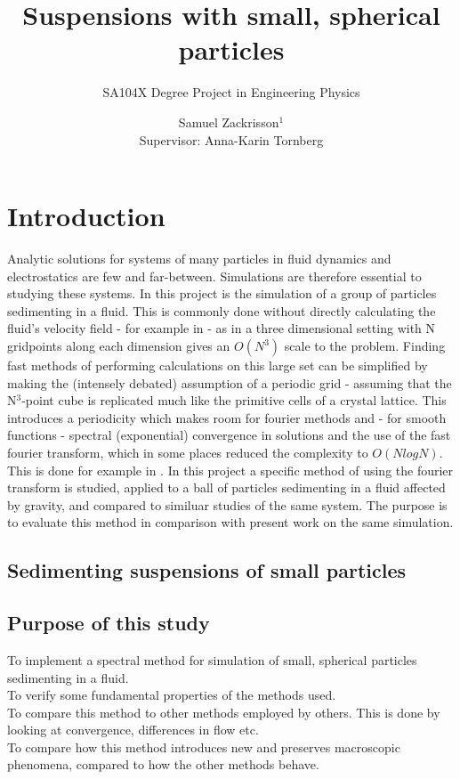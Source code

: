 \documentclass[a4paper,twoside=false,abstract=false,numbers=noenddot,
titlepage=false,headings=small,parskip=half,version=last]{scrartcl}
\title{Suspensions with small, spherical particles}
\subtitle{SA104X Degree Project in Engineering Physics}
\author[2]{Samuel Zackrisson$^1$ \\ \footnotesize Supervisor: Anna-Karin Tornberg}
\affil[1,2]{Department for Numerical Analysis, Royal Institute of Technology}
\affil[1]{samuelz@kth.se}
\affil[2]{akto@kth.se}
\begin{document}
\maketitle
\thispagestyle{empty}

\tableofcontents

\section{Introduction}
Analytic solutions for systems of many particles in fluid dynamics and electrostatics are few and far-between. Simulations are therefore essential to studying these systems. In this project is the simulation of a group of particles sedimenting in a fluid. This is commonly done without directly calculating the fluid's velocity field - for example in \cite{fallingclouds} - as in a three dimensional setting with N gridpoints along each dimension gives an $O(N^3)$ scale to the problem. Finding fast methods of performing calculations on this large set can be simplified by making the (intensely debated) assumption of a periodic grid - assuming that the N$^3$-point cube is replicated much like the primitive cells of a crystal lattice. This introduces a periodicity which makes room for fourier methods and - for smooth functions - spectral (exponential) convergence in solutions and the use of the fast fourier transform, which in some places reduced the complexity to $O(NlogN)$. This is done for example in \cite{fluctuatesediment}. In this project a specific method of using the fourier transform is studied, applied to a ball of particles sedimenting in a fluid affected by gravity, and compared to similuar studies of the same system. The purpose is to evaluate this method in comparison with present work on the same simulation.

\subsection{Sedimenting suspensions of small particles}

\subsection{Purpose of this study}
To implement a spectral method for simulation of small, spherical particles sedimenting in a fluid.\\
To verify some fundamental properties of the methods used.\\
To compare this method to other methods employed by others. This is done by looking at convergence, differences in flow etc.\\
To compare how this method introduces new and preserves macroscopic phenomena, compared to how the other methods behave.
\end{document}
